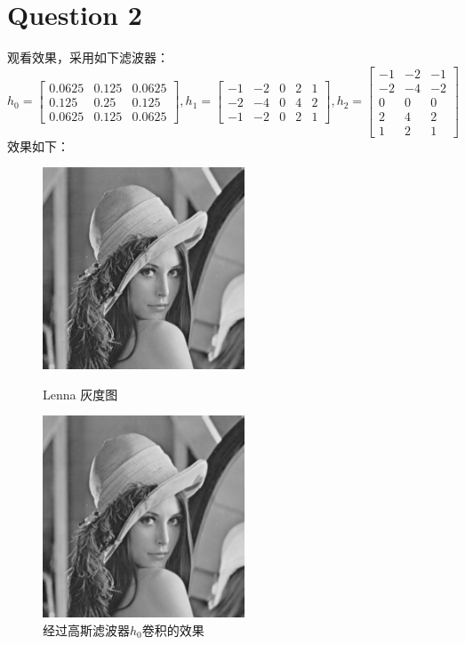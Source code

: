 \documentclass[a4paper,UTF8]{article}
\numberwithin{equation}{section}
\begin{document}
\section{Question 2}
观看效果，采用如下滤波器：
\begin{equation}
h_0={
\left[ \begin{array}{ccc}
0.0625 & 0.125 & 0.0625\\
  0.125 & 0.25 & 0.125\\
  0.0625 & 0.125 & 0.0625
\end{array} 
\right ]},
h_1={
\left[ \begin{array}{ccccc}
-1&-2&0&2&1\\
-2&-4&0&4&2\\
-1&-2&0&2&1
\end{array} 
\right ]},
h_2={
\left[ \begin{array}{ccc}
-1 & -2 & -1\\
  -2 & -4 & -2\\
  0 & 0 & 0\\
  2 & 4 & 2\\
  1 & 2 & 1
\end{array} 
\right ]}
\end{equation}
效果如下：
\begin{figure}[htbp]
\centering
\begin{minipage}[t]{0.48\textwidth}
\centering
\includegraphics[width=6cm]{Lenna_gray.png}
\caption{Lenna 灰度图}
\end{minipage}
\begin{minipage}[t]{0.48\textwidth}
\centering
\includegraphics[width=6cm]{Lenna_filter_gauss.png}
\caption{经过高斯滤波器$h_0$卷积的效果}
\end{minipage}
\end{figure}
\end{document}
